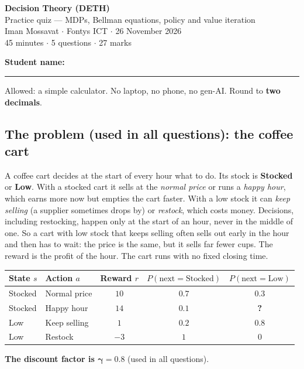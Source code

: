 \documentclass[11pt,a4paper]{article}
\begin{document}
\begin{center}
{\LARGE\bfseries Decision Theory (DETH)}\\[3pt]
{\Large Practice quiz --- MDPs, Bellman equations, policy and value iteration}\\[6pt]
Iman Mossavat $\cdot$ Fontys ICT $\cdot$ 26 November 2026\\
45 minutes $\cdot$ 5 questions $\cdot$ 27 marks
\end{center}
\textbf{Student name:} \rule{9cm}{0.4pt}


Allowed: a simple calculator. No laptop, no phone, no gen-AI. Round to \textbf{two decimals}.

\subsection*{The problem (used in all questions): the coffee cart}
A coffee cart decides at the start of every hour what to do. Its stock is \textbf{Stocked} or \textbf{Low}.
With a stocked cart it sells at the \emph{normal price} or runs a \emph{happy hour}, which earns more now but empties the cart faster.
With a low stock it can \emph{keep selling} (a supplier sometimes drops by) or \emph{restock}, which costs money.
Decisions, including restocking, happen only at the start of an hour, never in the middle of one.
So a cart with low stock that keeps selling often sells out early in the hour and then has to wait: the price is the same, but it sells far fewer cups.
The reward is the profit of the hour. The cart runs with no fixed closing time.

\begin{center}\renewcommand{\arraystretch}{1.3}
\begin{tabular}{llccc}
\toprule
State $s$ & Action $a$ & Reward $r$ & $P(\text{next}=\text{Stocked})$ & $P(\text{next}=\text{Low})$ \\ \midrule
Stocked & Normal price & $10$ & $0.7$ & $0.3$ \\
Stocked & Happy hour & $14$ & $0.1$ & \textbf{?} \\
Low & Keep selling & $1$ & $0.2$ & $0.8$ \\
Low & Restock & $-3$ & $1$ & $0$ \\
\bottomrule
\end{tabular}
\end{center}
\textbf{The discount factor is $\boldsymbol{\gamma = 0.8}$} (used in all questions).
\end{document}
